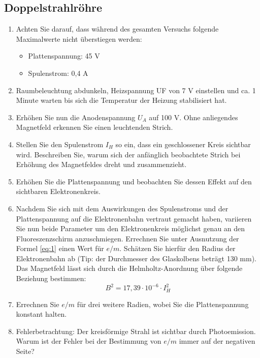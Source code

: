 \subsection{Doppelstrahlröhre}
\begin{enumerate}
	\item Achten Sie darauf, dass während des gesamten Versuchs folgende Maximalwerte nicht überstiegen werden:
	\begin{itemize}
		\item Plattenspannung: 45 V
		\item Spulenstrom: 0,4 A
	\end{itemize}
	\item Raumbeleuchtung abdunkeln, Heizspannung UF von 7 V einstellen und ca. 1 Minute warten bis sich die Temperatur der Heizung stabilisiert hat.
	\item Erhöhen Sie nun die Anodenspannung $U_A$ auf 100 V. Ohne anliegendes Magnetfeld erkennen Sie einen leuchtenden Strich.
	\item Stellen Sie den Spulenstrom $I_H$ so ein, dass ein geschlossener Kreis sichtbar wird. Beschreiben Sie, warum sich der anfänglich beobachtete Strich bei Erhöhung des Magnetfeldes dreht und zusammenzieht.
	\item Erhöhen Sie die Plattenspannung und beobachten Sie dessen Effekt auf den sichtbaren Elektronenkreis.
	\item Nachdem Sie sich mit dem Auswirkungen des Spulenstroms und der Plattenspannung auf die Elektronenbahn vertraut gemacht haben, variieren Sie nun beide Parameter um den Elektronenkreis möglichst genau an den Fluoreszenzschirm anzuschmiegen. Errechnen Sie unter Ausnutzung der Formel \eqref{eq:1} einen Wert für $e/m$. Schätzen Sie hierfür den Radius der Elektronenbahn ab (Tip: der Durchmesser des Glaskolbens beträgt 130 mm). Das Magnetfeld lässt sich durch die Helmholtz-Anordnung über folgende Beziehung bestimmen:
	\begin{displaymath}
		B^2=17,39\cdot 10^{-6}\cdot I_H^2
	\end{displaymath}
	\item Errechnen Sie $e/m$ für drei weitere Radien, wobei Sie die Plattenspannung konstant halten.
	\item Fehlerbetrachtung: Der kreisförmige Strahl ist sichtbar durch Photoemission. Warum ist der Fehler bei der Bestimmung von $e/m$ immer auf der negativen Seite?
\end{enumerate}